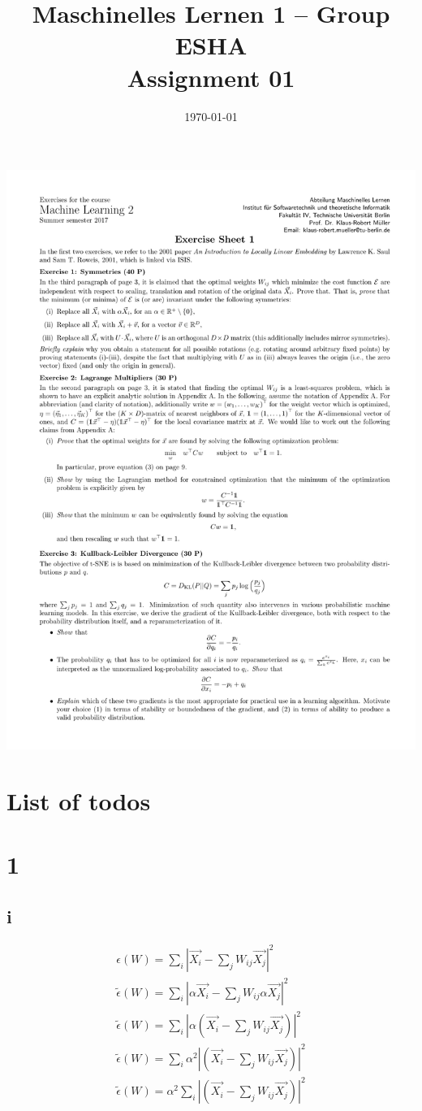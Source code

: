 \documentclass[11pt,a4paper]{article}
\title{Maschinelles Lernen 1 -- Group ESHA \\
        Assignment 01
}
\author{\students}
\date{\today}
\makeatletter
\newcommand\listtodoname{List of todos}
\newcommand\listoftodos{%
  \section*{\listtodoname}\@starttoc{tod}}
\makeatother
\begin{document}
\maketitle

\includegraphics[clip, trim=0.5cm 0.5cm 0.5cm 5cm, width=1.00\textwidth]{sheet01.pdf}

\listoftodos
\clearpage

\section*{1}

\subsection*{i}

\begin{gather*}
\epsilon(W) = \sum_{i} |\vec{X_{i}} - \sum_j W_{ij} \vec{X_{j}}| ^{2} \\
\tilde{\epsilon}(W) = \sum_{i} |\alpha \vec{X_{i}} - \sum_j W_{ij} \alpha \vec{X_{j}}| ^{2} \\
\tilde{\epsilon}(W) = \sum_{i} |\alpha (\vec{X_{i}} - \sum_j W_{ij} \vec{X_{j}})| ^{2} \\
\tilde{\epsilon}(W) = \sum_{i} \alpha^2 |(\vec{X_{i}} - \sum_j W_{ij} \vec{X_{j}})| ^{2} \\
\tilde{\epsilon}(W) = \alpha^2 \sum_{i} |(\vec{X_{i}} - \sum_j W_{ij} \vec{X_{j}})| ^{2} \\
\end{gather*}
\end{document}
